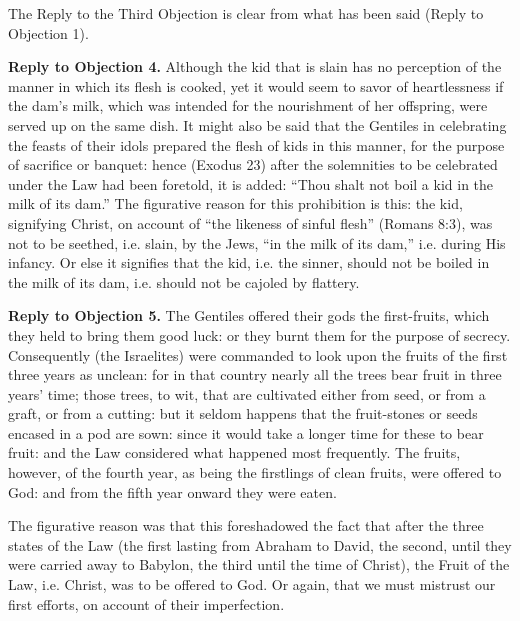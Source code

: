 The Reply to the Third Objection is clear from what has been said (Reply to Objection 1).

\textbf{Reply to Objection 4.} Although the kid that is slain has no perception of the manner in which its flesh is cooked, yet it would seem to savor of heartlessness if the dam's milk, which was intended for the nourishment of her offspring, were served up on the same dish. It might also be said that the Gentiles in celebrating the feasts of their idols prepared the flesh of kids in this manner, for the purpose of sacrifice or banquet: hence (Exodus 23) after the solemnities to be celebrated under the Law had been foretold, it is added: ``Thou shalt not boil a kid in the milk of its dam.'' The figurative reason for this prohibition is this: the kid, signifying Christ, on account of ``the likeness of sinful flesh'' (Romans 8:3), was not to be seethed, i.e. slain, by the Jews, ``in the milk of its dam,'' i.e. during His infancy. Or else it signifies that the kid, i.e. the sinner, should not be boiled in the milk of its dam, i.e. should not be cajoled by flattery.

\textbf{Reply to Objection 5.} The Gentiles offered their gods the first-fruits, which they held to bring them good luck: or they burnt them for the purpose of secrecy. Consequently (the Israelites) were commanded to look upon the fruits of the first three years as unclean: for in that country nearly all the trees bear fruit in three years' time; those trees, to wit, that are cultivated either from seed, or from a graft, or from a cutting: but it seldom happens that the fruit-stones or seeds encased in a pod are sown: since it would take a longer time for these to bear fruit: and the Law considered what happened most frequently. The fruits, however, of the fourth year, as being the firstlings of clean fruits, were offered to God: and from the fifth year onward they were eaten.

The figurative reason was that this foreshadowed the fact that after the three states of the Law (the first lasting from Abraham to David, the second, until they were carried away to Babylon, the third until the time of Christ), the Fruit of the Law, i.e. Christ, was to be offered to God. Or again, that we must mistrust our first efforts, on account of their imperfection.

